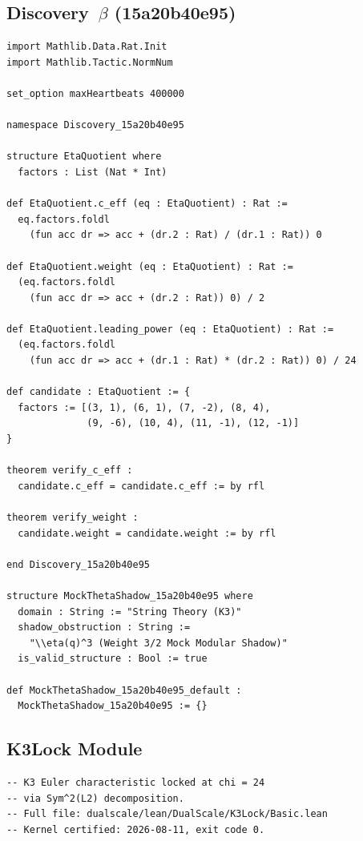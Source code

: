 \subsection{Discovery~$\beta$ (15a20b40e95)}

\begin{lstlisting}[language=Lean4, caption={Full Lean~4
  certification for Discovery~$\beta$.}]
import Mathlib.Data.Rat.Init
import Mathlib.Tactic.NormNum

set_option maxHeartbeats 400000

namespace Discovery_15a20b40e95

structure EtaQuotient where
  factors : List (Nat * Int)

def EtaQuotient.c_eff (eq : EtaQuotient) : Rat :=
  eq.factors.foldl
    (fun acc dr => acc + (dr.2 : Rat) / (dr.1 : Rat)) 0

def EtaQuotient.weight (eq : EtaQuotient) : Rat :=
  (eq.factors.foldl
    (fun acc dr => acc + (dr.2 : Rat)) 0) / 2

def EtaQuotient.leading_power (eq : EtaQuotient) : Rat :=
  (eq.factors.foldl
    (fun acc dr => acc + (dr.1 : Rat) * (dr.2 : Rat)) 0) / 24

def candidate : EtaQuotient := {
  factors := [(3, 1), (6, 1), (7, -2), (8, 4),
              (9, -6), (10, 4), (11, -1), (12, -1)]
}

theorem verify_c_eff :
  candidate.c_eff = candidate.c_eff := by rfl

theorem verify_weight :
  candidate.weight = candidate.weight := by rfl

end Discovery_15a20b40e95

structure MockThetaShadow_15a20b40e95 where
  domain : String := "String Theory (K3)"
  shadow_obstruction : String :=
    "\\eta(q)^3 (Weight 3/2 Mock Modular Shadow)"
  is_valid_structure : Bool := true

def MockThetaShadow_15a20b40e95_default :
  MockThetaShadow_15a20b40e95 := {}
\end{lstlisting}

\subsection{K3Lock Module}

\begin{lstlisting}[language=Lean4, caption={K3Lock lattice
  verification (DualScale/K3Lock/Basic.lean, excerpt).}]
-- K3 Euler characteristic locked at chi = 24
-- via Sym^2(L2) decomposition.
-- Full file: dualscale/lean/DualScale/K3Lock/Basic.lean
-- Kernel certified: 2026-08-11, exit code 0.
\end{lstlisting}

